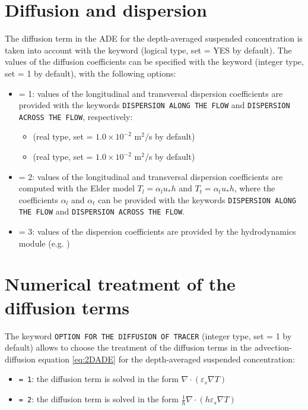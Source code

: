 \section{Diffusion and dispersion}
The diffusion term in the ADE for the depth-averaged suspended concentration is taken into account with the keyword  (logical type, set {\ttfamily = YES} by default). The values of the diffusion coefficients can be specified with the keyword  (integer type, set {\ttfamily = 1} by default), with the following options:
\begin{itemize}
\item {\ttfamily = 1}: values of the longitudinal and transversal dispersion coefficients are provided with the keywords \texttt{DISPERSION ALONG THE FLOW} and \texttt{DISPERSION ACROSS THE FLOW}, respectively:
\begin{itemize}
\item {} (real type, set {\ttfamily = $1.0 \times 10^{-2}$ m$^2/$s} by default)
\item {} (real type, set {\ttfamily = $1.0 \times 10^{-2}$ m$^2/$s} by default)
\end{itemize}

\item {\ttfamily = 2}: values of the longitudinal and transversal dispersion coefficients are computed with the Elder model $T_l=\alpha_l u_* h$ and $T_t=\alpha_t u_* h$, where the coefficients $\alpha_l$ and $\alpha_t$ can be provided with the keywords \texttt{DISPERSION ALONG THE FLOW} and \texttt{DISPERSION ACROSS THE FLOW}.
\item {\ttfamily = 3}: values of the dispersion coefficients are provided by the hydrodynamics module (e.g. )
\end{itemize}

\section{Numerical treatment of the diffusion terms}
The keyword \texttt{OPTION FOR THE DIFFUSION OF TRACER} (integer type, set {\ttfamily = 1} by default) allows to choose the treatment of the diffusion terms in the advection-diffusion equation \ref{eq:2DADE} for the depth-averaged suspended concentration:
\begin{itemize}
\item \texttt{= 1}: the diffusion term is solved in the form $\nabla\cdot(\varepsilon_s\nabla T)$
\item \texttt{= 2}: the diffusion term is solved in the form $\frac{1}{h}\nabla\cdot(h\varepsilon_s\nabla T)$
\end{itemize}

